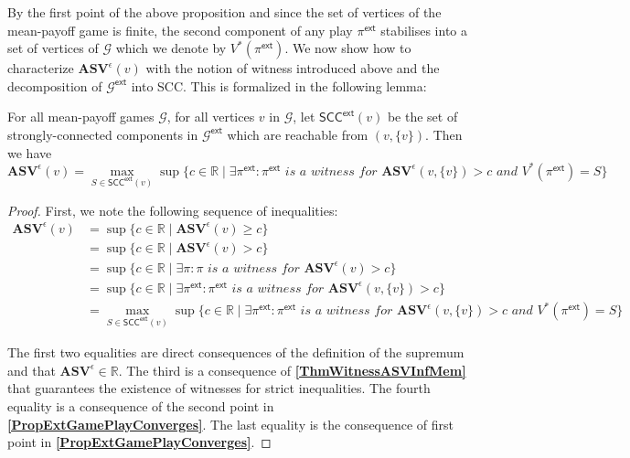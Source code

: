 By the first point of the above proposition and since the set of vertices of the mean-payoff game is finite, the second component of any play $\pi^{\mathsf{ext}}$ stabilises into a set of vertices of $\mathcal{G}$ which we denote by $V^{*}(\pi^{\mathsf{ext}})$. We now show how to characterize $\mathbf{ASV}^{\epsilon}(v)$ with the notion of witness introduced above and the decomposition of $\mathcal{G}^{\mathsf{ext}}$ into SCC. This is formalized in the following lemma:

\begin{lemma}
\label{LemASVMaxSCCExtGamePlay}
 For all mean-payoff games $\mathcal{G}$, for all vertices $v$ in $\mathcal{G}$, let $\mathsf{SCC}^{\mathsf{ext}}(v)$ be the set of strongly-connected components in $\mathcal{G}^{\mathsf{ext}}$ which are reachable from $(v, \{v\})$. Then we have
 \begin{equation*}
     \mathbf{ASV}^{\epsilon}(v) = \max \limits_{S \in \mathsf{SCC}^{\mathsf{ext}}(v)} \sup \{c \in \mathbb{R} \mid \exists \pi^{\mathsf{ext}}: \pi^{\mathsf{ext}} \textit{ is a witness for } \mathbf{ASV}^{\epsilon}(v, \{v\}) > c \textit{ and } V^{*}(\pi^{\mathsf{ext}}) = S \}
 \end{equation*}
\end{lemma}

\begin{proof}
First, we note the following sequence of inequalities:
\begin{equation*}
    \begin{split}
        \mathbf{ASV}^{\epsilon}(v) &= \sup \{ c \in \mathbb{R} \mid \mathbf{ASV}^{\epsilon}(v) \geqslant c \} \\
        &= \sup \{ c \in \mathbb{R} \mid \mathbf{ASV}^{\epsilon}(v) > c \} \\
        &= \sup \{ c \in \mathbb{R} \mid \exists \pi: \pi \textit{ is a witness for } \mathbf{ASV}^{\epsilon}(v) > c \} \\
        &= \sup \{ c \in \mathbb{R} \mid \exists \pi^{\mathsf{ext}}: \pi^{\mathsf{ext}} \textit{ is a witness for } \mathbf{ASV}^{\epsilon}(v, \{v\}) > c \} \\
        &= \max \limits_{S \in \mathsf{SCC}^{\mathsf{ext}}(v)} \sup \{ c \in \mathbb{R} \mid \exists \pi^{\mathsf{ext}}: \pi^{\mathsf{ext}} \textit{ is a witness for } \mathbf{ASV}^{\epsilon}(v, \{v\}) > c \textit{ and } V^{*}(\pi^{\mathsf{ext}}) = S \}
    \end{split}
\end{equation*}

The first two equalities are direct consequences of the definition of the supremum and that $\mathbf{ASV}^{\epsilon} \in \mathbb{R}$. The third is a consequence of \textbf{\cref{ThmWitnessASVInfMem}} that guarantees the existence of witnesses for strict inequalities. The fourth equality is a consequence of the second point in \textbf{\cref{PropExtGamePlayConverges}}. The last equality is the consequence of first point in \textbf{\cref{PropExtGamePlayConverges}}.
\end{proof}


